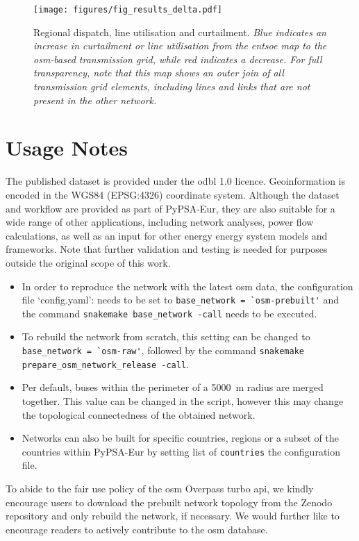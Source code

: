 \documentclass[fleqn,10pt]{wlscirep}
\newcommand{\colorcode}[1]{\colorbox{gray!20}{\lstinline|#1|}}
\begin{document}
\newpage
\begin{figure}[!htbp]
    \centering
    \texttt{[image: figures/fig\_results\_delta.pdf]}
    \caption{Regional dispatch, line utilisation and curtailment. \textit{Blue indicates an increase in curtailment or line utilisation from the \acrshort{entsoe} map to the \gls{osm}-based transmission grid, while red indicates a decrease. For full transparency, note that this map shows an outer join of all transmission grid elements, including lines and links that are not present in the other network.}}
    \label{fig:results_delta}
\end{figure}

\newpage

\section*{Usage Notes}
The published dataset is provided under the \gls{odbl} 1.0 licence. Geoinformation is encoded in the WGS84 (EPSG:4326) coordinate system. Although the dataset and workflow are provided as part of PyPSA-Eur, they are also suitable for a wide range of other applications, including network analyses, power flow calculations, as well as an input for other energy energy system models and frameworks. Note that further validation and testing is needed for purposes outside the original scope of this work. 

\begin{itemize}
    \item In order to reproduce the network with the latest \gls{osm} data, the configuration file `config.yaml': needs to be set to \colorcode{base_network = `osm-prebuilt'} and the command \colorcode{snakemake base_network -call} needs to be executed.
    \item To rebuild the network from scratch, this setting can be changed to \colorcode{base_network = `osm-raw'}, followed by the command \colorcode{snakemake prepare_osm_network_release -call}. 
    \item Per default, buses within the perimeter of a \SI{5000}{\meter} radius are merged together. This value can be changed in the script, however this may change the topological connectedness of the obtained network. 
    \item Networks can also be built for specific countries, regions or a subset of the countries within PyPSA-Eur by setting list of \colorcode{countries} the configuration file.
\end{itemize}
To abide to the fair use policy of the \acrshort{osm} Overpass turbo \acrshort{api}, we kindly encourage users to download the prebuilt network topology from the Zenodo repository and only rebuild the network, if necessary. We would further like to encourage readers to actively contribute to the \acrshort{osm} database.
\end{document}
